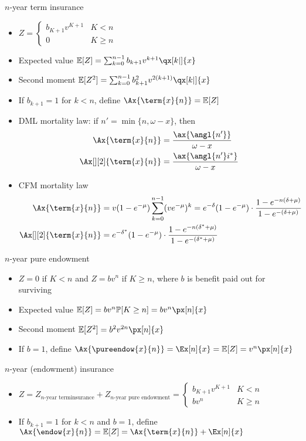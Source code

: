 $n$-year term insurance
\begin{itemize}
\item $Z = \begin{cases} b_{K + 1}v^{K + 1} & K < n \\ 0 & K\geq n \end{cases}$
\item Expected value $\mathbb{E}[Z] = \sum_{k = 0}^{n - 1} b_{k + 1}v^{k + 1}\qx[k|]{x}$
\item Second moment $\mathbb{E}[Z^2] = \sum_{k = 0}^{n - 1} b_{k + 1}^2v^{2(k + 1)}\qx[k|]{x}$
\item If $b_{k + 1} = 1$ for $k < n$, define $\Ax{\term{x}{n}} = \mathbb{E}[Z]$
\item DML mortality law: if $n' = \min\{n, \omega - x\}$, then
\begin{align*}
\Ax{\term{x}{n}} &= \frac{\ax{\angl{n'}}}{\omega - x} \\
\Ax[][2]{\term{x}{n}} &= \frac{\ax{\angl{n'}i^{*}}}{\omega - x}
\end{align*}
\item CFM mortality law
\begin{align*}
\Ax{\term{x}{n}} &= v(1 - e^{-\mu})\sum_{k = 0}^{n - 1} (ve^{-\mu})^k = e^{-\delta}(1 - e^{-\mu})\cdot\frac{1 - e^{-n(\delta + \mu)}}{1 - e^{-(\delta + \mu)}} \\
\Ax[][2]{\term{x}{n}} &= e^{-\delta^{*}}(1 - e^{-\mu})\cdot\frac{1 - e^{-n(\delta^{*} + \mu)}}{1 - e^{-(\delta^{*} + \mu)}}
\end{align*}
\end{itemize}

$n$-year pure endowment
\begin{itemize}
\item $Z = 0$ if $K < n$ and $Z = bv^n$ if $K\geq n$, where $b$ is benefit paid out for surviving
\item Expected value $\mathbb{E}[Z] = bv^n\mathbb{P}[K\geq n] = bv^n\px[n]{x}$
\item Second moment $\mathbb{E}[Z^2] = b^2v^{2n}\px[n]{x}$
\item If $b = 1$, define $\Ax{\pureendow{x}{n}} = \Ex[n]{x} = \mathbb{E}[Z] = v^n\px[n]{x}$
\end{itemize}

$n$-year (endowment) insurance
\begin{itemize}
\item $Z = Z_{n\text{-year terminsurance}} + Z_{n\text{-year pure endowment}} = \begin{cases} b_{K + 1}v^{K + 1} & K < n \\ bv^n & K\geq n \end{cases}$
\item If $b_{k + 1} = 1$ for $k < n$ and $b = 1$, define $\Ax{\endow{x}{n}} = \mathbb{E}[Z] = \Ax{\term{x}{n}} + \Ex[n]{x}$
\end{itemize}